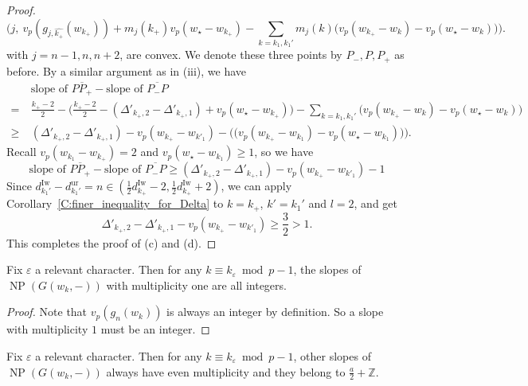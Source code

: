 \begin{proof}
    \begin{equation}
    \Big( j,\ v_p(g_{j, \hat{ k_+}}(w_{k_+})) + m_j(k_+)v_p(w_\star-w_{k_+}) - \sum _{k=k_1,k_1'}m_j(k)\big(v_p(w_{k_+}-w_{k})- v_p(w_\star-w_{k})  \big)\Big).
    \end{equation}
    with $j=n-1,n,n+2$, are convex. We denote these three points by $P_-,P,P_+$ as before. By a similar argument as in (iii), we have
    \begin{align*}
    &\textrm{slope of }\overline{PP_+}  - \textrm{slope of }\overline{P_-P}
    \\
    =\ & \frac{k_+-2}2 - \Big( \frac{k_+-2}2  -(\Delta'_{k_+, 2} - \Delta'_{k_+, 1}) +v_p(w_\star-w_{k_+})\Big) -
    \sum_{k=k_1,k_1'} \big(v_p(w_{k_+}-w_{k})- v_p(w_\star-w_{k})  \big)
    \\
    \geq \ &(\Delta'_{k_+, 2} - \Delta'_{k_+, 1})- v_p(w_{k_+}-w_{k'_1})-\Big(\big(v_p(w_{k_+}-w_{k_1})- v_p(w_\star-w_{k_1})  \big)\Big).
    \end{align*}
    Recall $v_p(w_{k_1}-w_{k_+})=2$ and $v_p(w_\star-w_{k_1})\geq 1$, so we have
    \[
    \textrm{slope of }\overline{PP_+}  - \textrm{slope of }\overline{P_-P}\geq (\Delta'_{k_+, 2} - \Delta'_{k_+, 1}) - v_p(w_{k_+}-w_{k'_1})-1
    \]
    Since $d_{k_1'}^{\mathrm{Iw}}-d_{k_1'}^{\mathrm{ur}}=n\in (\frac 12 d_{k_+}^{\mathrm{Iw}}-2,\frac 12 d_{k_+}^{\mathrm{Iw}}+2)$, we can apply Corollary~\ref{C:finer_inequality_for_Delta} to $k=k_+$, $k'=k_1'$ and $l=2$, and get
    \[
    \Delta'_{k_+, 2} - \Delta'_{k_+, 1}- v_p(w_{k_+}-w_{k'_1})\geq \frac 32>1.
    \]
    This completes the proof of (c) and (d).
\end{proof}

\begin{corollary}
    \label{C:integrality_of_slopes_of_G_part1}
    Fix $\varepsilon$ a relevant character. Then for any $k \equiv k_\varepsilon  \bmod p-1$, the slopes of ${\operatorname{NP}}(G(w_k, - ))$ with multiplicity one are all integers.
\end{corollary}

\begin{proof}
    Note that $v_p(g_n(w_k))$ is always an integer by definition. So a slope with multiplicity $1$ must be an integer.
\end{proof}

\begin{corollary}
    \label{C:integrality_of_slopes_of_G_part2}
    Fix $\varepsilon$ a relevant character. Then for any $k \equiv k_\varepsilon  \bmod p-1$, other slopes of ${\operatorname{NP}}(G(w_k, - ))$ always have even multiplicity and they belong to $\frac a2 +{\mathbb{Z}}$.
\end{corollary}

